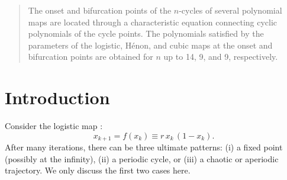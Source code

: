 \documentclass{ws-ijbc}
\begin{document}
\begin{abstract}
The onset and bifurcation points of the $n$-cycles of
  several polynomial maps are located
  through a characteristic equation
  connecting cyclic polynomials of the cycle points.
The polynomials satisfied by the parameters
  of the logistic, H\'enon, and cubic maps
  at the onset and bifurcation points are obtained
  for $n$ up to 14, 9, and 9,
  respectively.
\end{abstract}




\twocolumn

%
%
\section{Introduction}
%
%

Consider the logistic map \cite{may, strogatz}:
%
\begin{equation}
  x_{k+1} = f(x_k) \equiv r \, x_k \, ( 1 - x_k ).
\label{eq:logmap}
\end{equation}
%
%
%
%
%
After many iterations, there can be three ultimate patterns:
  (i) a fixed point (possibly at the infinity),
  (ii) a periodic cycle,
or
  (iii) a chaotic or aperiodic trajectory.
We only discuss the first two cases here.
\end{document}
